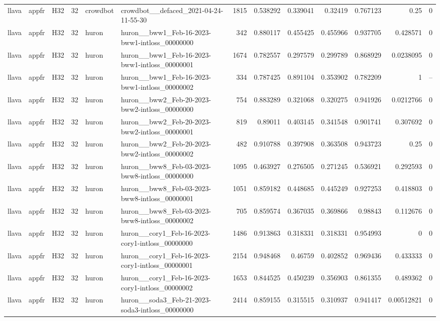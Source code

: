 \begin{longtable}{lllrllrrrrrrr}
llava & appfr & H32 & 32 & crowdbot & crowdbot\_\_defaced\_2021-04-24-11-55-30 & 1815 & 0.538292 & 0.339041 & 0.32419 & 0.767123 & 0.25 & 0 \\
llava & appfr & H32 & 32 & huron & huron\_\_bww1\_Feb-16-2023-bww1-intloss\_00000000 & 342 & 0.880117 & 0.455425 & 0.455966 & 0.937705 & 0.428571 & 0 \\
llava & appfr & H32 & 32 & huron & huron\_\_bww1\_Feb-16-2023-bww1-intloss\_00000001 & 1674 & 0.782557 & 0.297579 & 0.299789 & 0.868929 & 0.0238095 & 0 \\
llava & appfr & H32 & 32 & huron & huron\_\_bww1\_Feb-16-2023-bww1-intloss\_00000002 & 334 & 0.787425 & 0.891104 & 0.353902 & 0.782209 & 1 & -- \\
llava & appfr & H32 & 32 & huron & huron\_\_bww2\_Feb-20-2023-bww2-intloss\_00000000 & 754 & 0.883289 & 0.321068 & 0.320275 & 0.941926 & 0.0212766 & 0 \\
llava & appfr & H32 & 32 & huron & huron\_\_bww2\_Feb-20-2023-bww2-intloss\_00000001 & 819 & 0.89011 & 0.403145 & 0.341548 & 0.901741 & 0.307692 & 0 \\
llava & appfr & H32 & 32 & huron & huron\_\_bww2\_Feb-20-2023-bww2-intloss\_00000002 & 482 & 0.910788 & 0.397908 & 0.363508 & 0.943723 & 0.25 & 0 \\
llava & appfr & H32 & 32 & huron & huron\_\_bww8\_Feb-03-2023-bww8-intloss\_00000000 & 1095 & 0.463927 & 0.276505 & 0.271245 & 0.536921 & 0.292593 & 0 \\
llava & appfr & H32 & 32 & huron & huron\_\_bww8\_Feb-03-2023-bww8-intloss\_00000001 & 1051 & 0.859182 & 0.448685 & 0.445249 & 0.927253 & 0.418803 & 0 \\
llava & appfr & H32 & 32 & huron & huron\_\_bww8\_Feb-03-2023-bww8-intloss\_00000002 & 705 & 0.859574 & 0.367035 & 0.369866 & 0.98843 & 0.112676 & 0 \\
llava & appfr & H32 & 32 & huron & huron\_\_cory1\_Feb-16-2023-cory1-intloss\_00000000 & 1486 & 0.913863 & 0.318331 & 0.318331 & 0.954993 & 0 & 0 \\
llava & appfr & H32 & 32 & huron & huron\_\_cory1\_Feb-16-2023-cory1-intloss\_00000001 & 2154 & 0.948468 & 0.46759 & 0.402852 & 0.969436 & 0.433333 & 0 \\
llava & appfr & H32 & 32 & huron & huron\_\_cory1\_Feb-16-2023-cory1-intloss\_00000002 & 1653 & 0.844525 & 0.450239 & 0.356903 & 0.861355 & 0.489362 & 0 \\
llava & appfr & H32 & 32 & huron & huron\_\_soda3\_Feb-21-2023-soda3-intloss\_00000000 & 2414 & 0.859155 & 0.315515 & 0.310937 & 0.941417 & 0.00512821 & 0 \\

\end{longtable}
